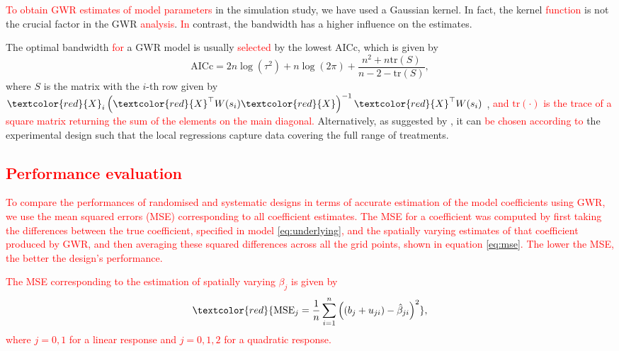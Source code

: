 \documentclass[a4paper]{article} 	%
\newcommand{\tr}{\mathrm{tr}}
\newcommand{\R}{\texttt{R}}
\newcommand{\revision}[1]{\textcolor{red}{#1}}
\newcommand{\zc}[1]{\textcolor{red}{#1}}
\begin{document}
\revision{To obtain GWR estimates of model parameters} in the simulation study, we have used a Gaussian kernel. In fact, the kernel \revision{function} is not the crucial factor in the GWR \revision{analysis}. \revision{In} contrast, the bandwidth has a higher influence on the estimates. 


The optimal bandwidth \revision{for} a GWR model is usually \revision{selected} by the lowest AICc, which is given by 
\begin{equation}\label{eq:aicc}
	\mbox{AICc} = 2n\log (\tau^2) + n \log (2\pi) + \frac{n^2+n\tr (S)}{n-2-\tr (S)},
\end{equation}
where $S$ is the matrix with the $i$-th row given by $\revision{X}_i\left( \revision{X}^\top W(s_i) \revision{X} \right)^{-1}\revision{X}^\top W(s_i)$ \parencite{Evans2020Assessment}, \zc{and $\tr(\cdot)$ is the trace of a square matrix returning the sum of the elements on the main diagonal.} Alternatively, as suggested by \textcite{Rakshit2020Novel}, it can \zc{be chosen according to} the experimental design such that the local regressions capture data covering the full range of treatments.



\subsection{\revision{Performance evaluation}}


\zc{To compare the performances of randomised and systematic designs in terms of accurate estimation of the model coefficients using GWR, we use the mean squared errors (MSE) corresponding to all coefficient estimates.} \revision{The MSE for a coefficient was computed by first taking the differences between the true coefficient, specified in model \eqref{eq:underlying}, and the spatially varying estimates of that coefficient produced by GWR, and then averaging these squared differences across all the grid points, shown in equation \eqref{eq:mse}. The lower the MSE, the better the design's performance.} 

\revision{The MSE corresponding to the estimation of spatially varying $\beta_{j}$ is given by}
\begin{equation}\label{eq:mse}
\zc{\text{MSE}_j = \frac{1}{n} \sum_{i=1}^{n} \left( (b_j+u_{ji}) - \hat{\beta}_{ji} \right)^2},
\end{equation}
\zc{where $j = 0, 1$ for a linear response and $j = 0, 1, 2$ for a quadratic response.}
\end{document}
